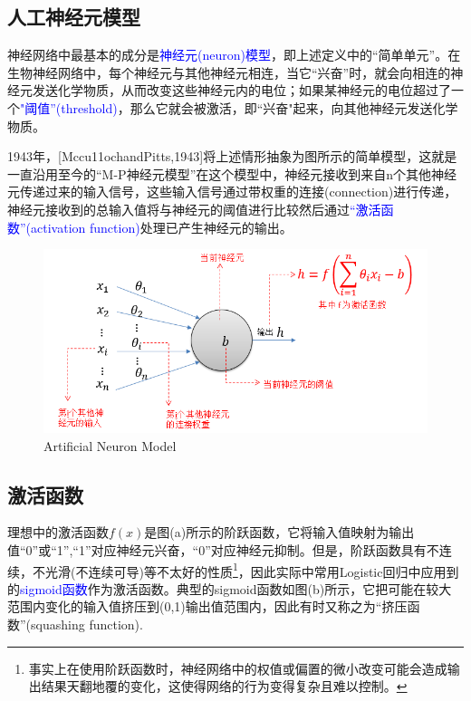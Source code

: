 \subsection{人工神经元模型}

神经网络中最基本的成分是\textcolor{blue}{神经元(neuron)模型}，即上述定义中的“简单单元”。在生物神经网络中，每个神经元与其他神经元相连，当它“兴奋”时，就会向相连的神经元发送化学物质，从而改变这些神经元内的电位；如果某神经元的电位超过了一个\textcolor{blue}{"阈值”(threshold)}，那么它就会被激活，即“兴奋"起来，向其他神经元发送化学物质。

1943年，[Mccu11ochandPitts,1943]将上述情形抽象为图所示的简单模型，这就是一直沿用至今的“M-P神经元模型”在这个模型中，神经元接收到来自n个其他神经元传递过来的输入信号，这些输入信号通过带权重的连接(connection)进行传递，神经元接收到的总输入值将与神经元的阈值进行比较然后通过\textcolor{blue}{“激活函数”(activation function)}处理已产生神经元的输出。

\begin{figure}[h]
\small
\centering
\includegraphics[width=14cm]{figure//3.png}
\caption{Artificial Neuron Model} \label{fig:3}
\end{figure}

\subsection*{激活函数}
理想中的激活函数$f(x)$是图(a)所示的阶跃函数，它将输入值映射为输出值“0”或“1”,“1”对应神经元兴奋，“0”对应神经元抑制。但是，阶跃函数具有不连续，不光滑(不连续可导)等不太好的性质\footnote{事实上在使用阶跃函数时，神经网络中的权值或偏置的微小改变可能会造成输出结果天翻地覆的变化，这使得网络的行为变得复杂且难以控制。}，因此实际中常用Logistic回归中应用到的\textcolor{blue}{sigmoid函数}作为激活函数。典型的sigmoid函数如图(b)所示，它把可能在较大范围内变化的输入值挤压到(0,1)输出值范围内，因此有时又称之为“挤压函数”(squashing function).

